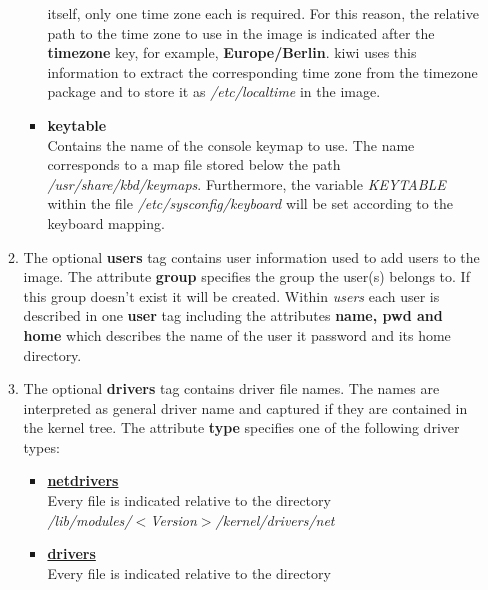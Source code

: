 \begin{itemize}
\begin{enumerate}
\begin{itemize}
                    itself, only one time zone each is required. For this
                    reason, the relative path to the time zone to use in the
                    image is indicated after the \textbf{timezone} key, for
                    example, \textbf{Europe/Berlin}. kiwi uses this information
                    to extract the corresponding time zone from the timezone
                    package and to store it as \textit{/etc/localtime} in the
                    image.
              \item \textbf{keytable}\\
                    Contains the name of the console keymap to use. The name
                    corresponds to a map file stored below the path
                    \textit{/usr/share/kbd/keymaps}. Furthermore, the variable
                    \textit{KEYTABLE} within the file
                    \textit{/etc/sysconfig/keyboard} will be set according
                    to the keyboard mapping.
          \end{itemize}
          \item The optional \textbf{users} tag contains user information
                used to add users to the image. The attribute \textbf{group}
                specifies the group the user(s) belongs to. If this group
                doesn't exist it will be created. Within \textit{users}
                each user is described in one \textbf{user} tag including the
                attributes \textbf{name, pwd and home} which describes the
                name of the user it password and its home directory.
          \item The optional \textbf{drivers} tag contains driver file names.
                The names are interpreted as general driver name and captured
                if they are contained in the kernel tree. The attribute
                \textbf{type} specifies one of the following driver types:
                \begin{itemize}
                \item \textbf{\underline{netdrivers}}\\
                      Every file is indicated relative to the directory\\
                      \textit{/lib/modules/$<$Version$>$/kernel/drivers/net}
                \item \textbf{\underline{drivers}}\\
                      Every file is indicated relative to the directory\\

\end{itemize}
\end{enumerate}
\end{itemize}
